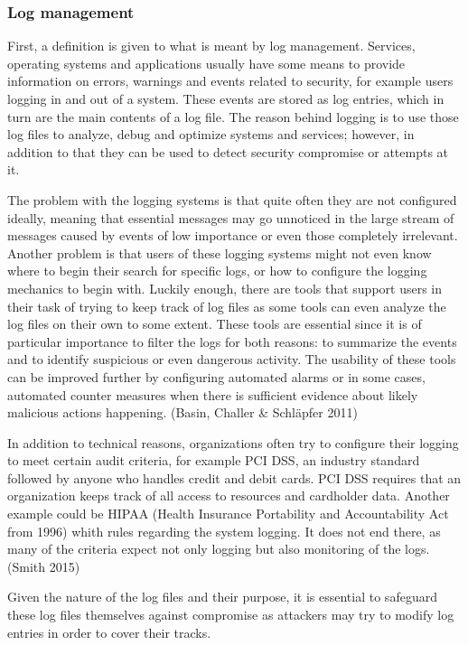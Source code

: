 \documentclass{article}
\begin{document}
\subsubsection{Log management}
First, a definition is given to what is meant by log management. Services, operating systems and applications usually have some means to provide information on errors, warnings and events related to security, for example users logging in and out of a system. These events are stored as log entries, which in turn are the main contents of a log file. The reason behind logging is to use those log files to analyze, debug and optimize systems and services; however, in addition to that they can be used to detect security compromise or attempts at it.
\par
The problem with the logging systems is that quite often they are not configured ideally, meaning that essential messages may go unnoticed in the large stream of messages caused by events of low importance or even those completely irrelevant. Another problem is that users of these logging systems might not even know where to begin their search for specific logs, or how to configure the logging mechanics to begin with. Luckily enough, there are tools that support users in their task of trying to keep track of log files as some tools can even analyze the log files on their own to some extent. These tools are essential since it is of particular importance to filter the logs for both reasons: to summarize the events and to identify suspicious or even dangerous activity. The usability of these tools can be improved further by configuring automated alarms or in some cases, automated counter measures when there is sufficient evidence about likely malicious actions happening. (Basin, Challer \& Schläpfer 2011)
\par
In addition to technical reasons, organizations often try to configure their logging to meet certain audit criteria, for example PCI DSS, an industry standard followed by anyone who handles credit and debit cards. PCI DSS requires that an organization keeps track of all access to resources and cardholder data. Another example could be HIPAA (Health Insurance Portability and Accountability Act from 1996) whith rules regarding the system logging. It does not end there, as many of the criteria expect not only logging but also monitoring of the logs. (Smith 2015)
\par
Given the nature of the log files and their purpose, it is essential to safeguard these log files themselves against compromise as attackers may try to modify log entries in order to cover their tracks.
\end{document}
